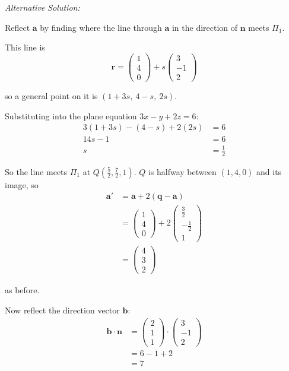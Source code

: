 \documentclass[leqno]{article}
\begin{document}
\begin{enumerate}[
  label=\textbf{\arabic*.},
  leftmargin=*,
  topsep=0pt,
  partopsep=0pt,
  parsep=0pt
]
\begin{djsSolution}
\begin{enumerate}[label=\textbf{(\alph*)}]
{\setlength{\parskip}{8pt}%
\textit{Alternative Solution:}

Reflect $\mathbf a$ by finding where the line through $\mathbf a$ in the direction of $\mathbf n$ meets $\Pi_1$.

This line is
\[
\mathbf r=\begin{pmatrix}1\\4\\0\end{pmatrix}+s\begin{pmatrix}3\\-1\\2\end{pmatrix}
\]

so a general point on it is $(1+3s,\ 4-s,\ 2s)$.

Substituting into the plane equation $3x-y+2z=6$:
\begin{align*}
3(1+3s)-(4-s)+2(2s)&=6\\
14s-1&=6\\
s&=\tfrac12
\end{align*}

So the line meets $\Pi_1$ at $Q\left(\frac52,\frac72,1\right)$. $Q$ is halfway between $(1,4,0)$ and its image, so
\begin{align*}
\mathbf a'&=\mathbf a+2(\mathbf q-\mathbf a)\\
&=\begin{pmatrix}1\\4\\0\end{pmatrix}+2\begin{pmatrix}\frac32\\[2pt]-\frac12\\[2pt]1\end{pmatrix}\\
&=\begin{pmatrix}4\\3\\2\end{pmatrix}
\end{align*}

as before.
\par}

\vspace{8pt}
Now reflect the direction vector $\mathbf b$:
\begin{align*}
\mathbf b\cdot\mathbf n
&=
\begin{pmatrix}2\\1\\1\end{pmatrix}\cdot
\begin{pmatrix}3\\-1\\2\end{pmatrix}\\
&=6-1+2\\
&=7
\end{align*}


\end{enumerate}
\end{djsSolution}
\end{enumerate}
\end{document}
